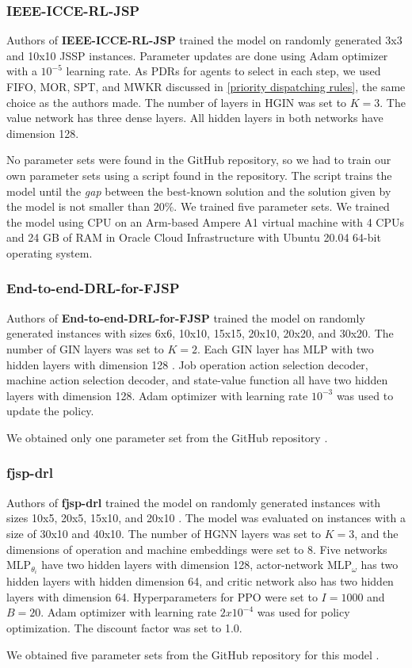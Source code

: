 \subsubsection{IEEE-ICCE-RL-JSP}
Authors of \textbf{IEEE-ICCE-RL-JSP} trained the model on randomly generated 3x3 and 10x10 JSSP instances. Parameter updates are done using Adam optimizer with a $10^{-5}$ learning rate. As PDRs for agents to select in each step, we used FIFO, MOR, SPT, and MWKR discussed in \ref{priority dispatching rules}, the same choice as the authors made. The number of layers in HGIN was set to $K=3$. The value network has three dense layers. All hidden layers in both networks have dimension 128.
\par
No parameter sets were found in the GitHub repository\cite{github_ieee_icce_rl_jsp}, so we had to train our own parameter sets using a script found in the repository. The script trains the model until the \textit{gap} between the best-known solution and the solution given by the model is not smaller than 20$\%$. We trained five parameter sets. We trained the model using CPU on an Arm-based Ampere A1 virtual machine with 4 CPUs and 24 GB of RAM in Oracle Cloud Infrastructure with Ubuntu 20.04 64-bit operating system.

\subsubsection{End-to-end-DRL-for-FJSP}
Authors of \textbf{End-to-end-DRL-for-FJSP} trained the model on randomly generated instances with sizes 6x6, 10x10, 15x15, 20x10, 20x20, and 30x20. The number of GIN layers was set to $K = 2$. Each GIN layer has MLP with two hidden layers with dimension 128 \cite{LEI2022117796}. Job operation action selection decoder, machine action selection decoder, and state-value function all have two hidden layers with dimension 128. Adam optimizer with learning rate $10^{-3}$ was used to update the policy.
\par
We obtained only one parameter set from the GitHub repository \cite{github_end_to_end_drl_for_fjsp}.

\subsubsection{fjsp-drl}
Authors of \textbf{fjsp-drl} trained the model on randomly generated instances with sizes 10x5, 20x5, 15x10, and 20x10 \cite{9826438}. The model was evaluated on instances with a size of 30x10 and 40x10. The number of HGNN layers was set to $K = 3$, and the dimensions of operation and machine embeddings were set to 8. Five networks $\text{MLP}_{\theta_i}$ have two hidden layers with dimension 128, actor-network $\text{MLP}_\omega$ has two hidden layers with hidden dimension 64, and critic network also has two hidden layers with dimension 64. Hyperparameters for PPO were set to $I = 1000$ and $B = 20$. Adam optimizer with learning rate $2x10^{-4}$ was used for policy optimization. The discount factor was set to 1.0.
\par
We obtained five parameter sets from the GitHub repository for this model \cite{github_fjsp_drl}.

